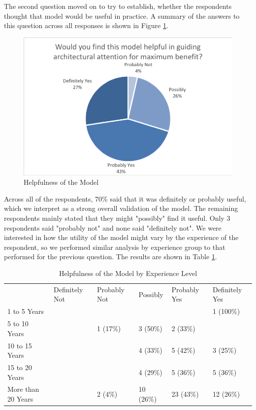 The second question moved on to try to establish, whether the respondents thought that model would be useful in practice.  A summary of the answers to this question across all responses is shown in Figure \ref{figure:helpfulness}.
 
\begin{figure}
\centering
\includegraphics[width=12cm]{Figures/prioritisation-helpfulness}
\caption{Helpfulness of the Model}
\label{figure:helpfulness}
\end{figure}

Across all of the respondents, 70\% said that it was definitely or probably useful, which we interpret as a strong overall validation of the model.  The remaining respondents mainly stated that they might "possibly" find it useful.  Only 3 respondents said "probably not" and none said "definitely not".
We were interested in how the utility of the model might vary by the experience of the respondent, so we performed similar analysis by experience group to that performed for the previous question.  The results are shown in Table \ref{table:helpfulness}.

\begin{table}
\caption{Helpfulness of the Model by Experience Level}
\label{table:helpfulness}
\footnotesize
\begin{tabular}{l p{1.5cm} p{1.5cm} p{1.5cm} p{1.5cm} p{1.5cm}}
 & Definitely Not & Probably Not & Possibly & Probably Yes & Definitely Yes \\
1 to 5 Years       & &          &           &           & 1 (100\%) \\
5 to 10 Years      & & 1 (17\%) & 3 (50\%)  & 2 (33\%)  & \\
10 to 15 Years	   & &          & 4 (33\%)  & 5 (42\%)  & 3 (25\%) \\
15 to 20 Years     & &          & 4 (29\%)  & 5 (36\%)  & 5 (36\%) \\
More than 20 Years & & 2 (4\%)  & 10 (26\%) & 23 (43\%) & 12 (26\%) \\
\end{tabular}
\end{table}

